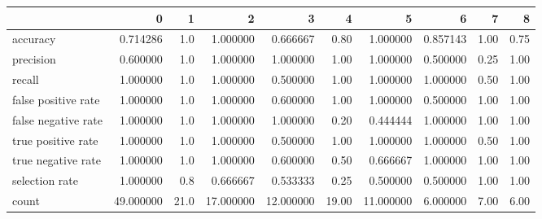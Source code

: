 \begin{tabular}{lrrrrrrrrr}
\toprule
{} &          0 &     1 &          2 &          3 &      4 &          5 &         6 &     7 &     8 \\
\midrule
accuracy            &   0.714286 &   1.0 &   1.000000 &   0.666667 &   0.80 &   1.000000 &  0.857143 &  1.00 &  0.75 \\
precision           &   0.600000 &   1.0 &   1.000000 &   1.000000 &   1.00 &   1.000000 &  0.500000 &  0.25 &  1.00 \\
recall              &   1.000000 &   1.0 &   1.000000 &   0.500000 &   1.00 &   1.000000 &  1.000000 &  0.50 &  1.00 \\
false positive rate &   1.000000 &   1.0 &   1.000000 &   0.600000 &   1.00 &   1.000000 &  0.500000 &  1.00 &  1.00 \\
false negative rate &   1.000000 &   1.0 &   1.000000 &   1.000000 &   0.20 &   0.444444 &  1.000000 &  1.00 &  1.00 \\
true positive rate  &   1.000000 &   1.0 &   1.000000 &   0.500000 &   1.00 &   1.000000 &  1.000000 &  0.50 &  1.00 \\
true negative rate  &   1.000000 &   1.0 &   1.000000 &   0.600000 &   0.50 &   0.666667 &  1.000000 &  1.00 &  1.00 \\
selection rate      &   1.000000 &   0.8 &   0.666667 &   0.533333 &   0.25 &   0.500000 &  0.500000 &  1.00 &  1.00 \\
count               &  49.000000 &  21.0 &  17.000000 &  12.000000 &  19.00 &  11.000000 &  6.000000 &  7.00 &  6.00 \\
\bottomrule
\end{tabular}
